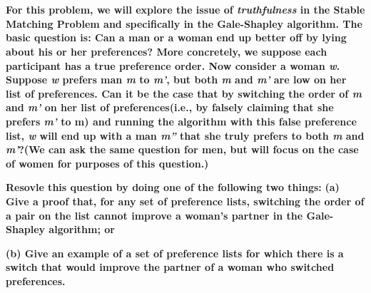 
\chapter{}
\textbf{
For this problem, we will explore the issue of \emph{truthfulness} in the Stable Matching Problem and specifically in the Gale-Shapley algorithm. The basic question is: Can a man or a woman end up better off by lying about his or her preferences? More concretely, we suppose each participant has a true preference order. Now consider a woman \emph{w}. Suppose \emph{w} prefers man \emph{m} to \emph{m'}, but both \emph{m} and \emph{m'} are low on her list of preferences. Can it be the case that by switching the order of \emph{m} and \emph{m'} on her list of preferences(i.e., by falsely claiming that she prefers \emph{m'} to m) and running the algorithm with this false preference list, \emph{w} will end up with a man \emph{m''} that she truly prefers to both \emph{m} and \emph{m'}?(We can ask the same question for men, but will focus on the case of women for purposes of this question.)
}

\textbf{
Resovle this question by doing one of the following two things:
}
\textbf{
(a) Give a proof that, for any set of preference lists, switching the order of a pair on the list cannot improve a woman's partner in the Gale-Shapley algorithm; or
}

\textbf{
(b) Give an example of a set of preference lists for which there is a switch that would improve the partner of a woman who switched preferences.
}
\hspace*{\fill} \\

